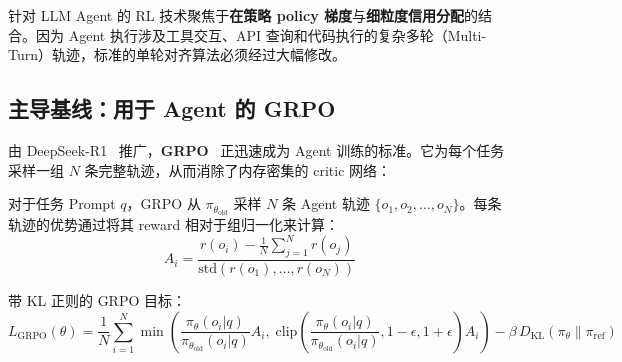 针对 LLM Agent 的 RL 技术聚焦于\textbf{在策略 policy 梯度}与\textbf{细粒度信用分配}的结合。因为 Agent 执行涉及工具交互、API 查询和代码执行的复杂多轮（Multi-Turn）轨迹，标准的单轮对齐算法必须经过大幅修改。

\subsection{主导基线：用于 Agent 的 GRPO}
\label{dominant-baseline-grpo-for-agents}

由 DeepSeek-R1~\cite{deepseek2025r1} 推广，\textbf{GRPO}~\cite{shao2024deepseekmath} 正迅速成为 Agent 训练的标准。它为每个任务采样一组 $N$ 条完整轨迹，从而消除了内存密集的 critic 网络：

对于任务 Prompt $q$，GRPO 从 $\pi_{\theta_{\text{old}}}$ 采样 $N$ 条 Agent 轨迹 $\{o_1, o_2, \dots, o_N\}$。每条轨迹的优势通过将其 reward 相对于组归一化来计算：
\begin{equation}
\boxed{A_i = \frac{r(o_i) - \frac{1}{N}\sum_{j=1}^N r(o_j)}{\text{std}(r(o_1), \dots, r(o_N))}}
\end{equation}

带 KL 正则的 GRPO 目标：
\begin{equation}
L_{\text{GRPO}}(\theta) = \frac{1}{N} \sum_{i=1}^N \min\!\left( \frac{\pi_\theta(o_i|q)}{\pi_{\theta_{\text{old}}}(o_i|q)} A_i,\; \text{clip}\!\left(\frac{\pi_\theta(o_i|q)}{\pi_{\theta_{\text{old}}}(o_i|q)}, 1{-}\epsilon, 1{+}\epsilon\right) A_i \right) - \beta\, D_{\text{KL}}(\pi_\theta \| \pi_{\text{ref}})
\end{equation}

